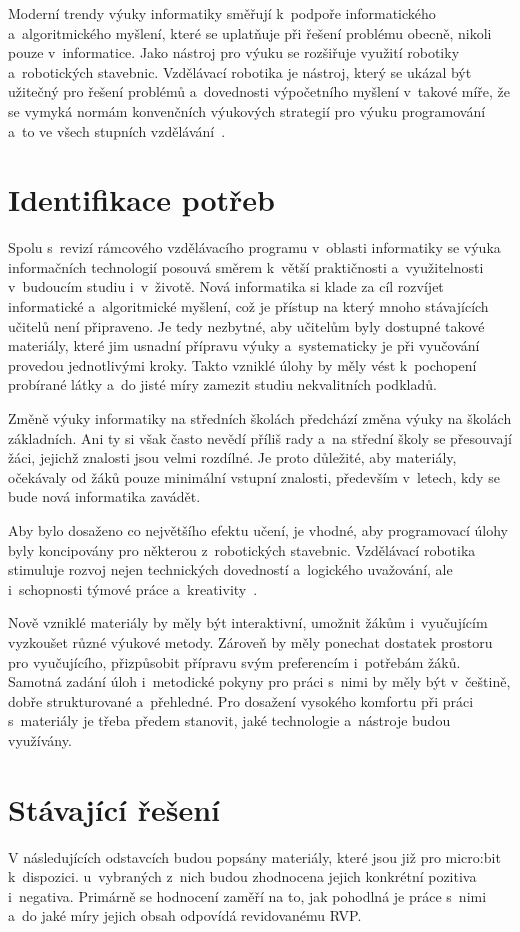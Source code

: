 \documentclass[
  digital,     %
  oneside,     %
  nosansbold,  %
  colorbold, %
  lof,         %
  nolot,         %
]{fithesis4}
\begin{document}
Moderní trendy výuky informatiky směřují k~podpoře informatického a~algoritmického myšlení, které se uplatňuje při řešení problému obecně, nikoli pouze v~informatice. Jako nástroj pro výuku se rozšiřuje využití robotiky a~robotických stavebnic. Vzdělávací robotika je nástroj, který se ukázal být užitečný pro řešení problémů a~dovednosti výpočetního myšlení v~takové míře, že se vymyká normám konvenčních výukových strategií pro výuku programování a~to ve všech stupních vzdělávání~\cite{Noor20}. 

\section{Identifikace potřeb}
Spolu s~revizí rámcového vzdělávacího programu v~oblasti informatiky se výuka informačních technologií posouvá směrem k~větší praktičnosti a~využitelnosti v~budoucím studiu i~v~životě. Nová informatika si klade za cíl rozvíjet informatické a~algoritmické myšlení, což je přístup na který mnoho stávajících učitelů není připraveno. Je tedy nezbytné, aby učitelům byly dostupné takové materiály, které jim usnadní přípravu výuky a~systematicky je při vyučování provedou jednotlivými kroky. Takto vzniklé úlohy by měly vést k~pochopení probírané látky a~do jisté míry zamezit studiu nekvalitních podkladů.

Změně výuky informatiky na středních školách předchází změna výuky na školách základních. Ani ty si však často nevědí příliš rady a~na střední školy se přesouvají žáci, jejichž znalosti jsou velmi rozdílné. Je proto důležité, aby materiály,  očekávaly od žáků pouze minimální vstupní znalosti, především v~letech, kdy se bude nová informatika zavádět.

Aby bylo dosaženo co největšího efektu učení, je vhodné, aby programovací úlohy byly koncipovány pro některou z~robotických stavebnic. Vzdělávací robotika stimuluje rozvoj nejen technických dovedností a~logického uvažování, ale i~schopnosti týmové práce a~kreativity~\cite{Souza18}. 

Nově vzniklé materiály by měly být interaktivní, umožnit žákům i~vyučujícím vyzkoušet různé výukové metody. Zároveň by měly ponechat dostatek prostoru pro vyučujícího, přizpůsobit přípravu svým preferencím i~potřebám žáků. Samotná zadání úloh i~metodické pokyny pro práci s~nimi by měly být v~češtině, dobře strukturované a~přehledné. Pro dosažení vysokého komfortu při práci s~materiály je třeba předem stanovit, jaké technologie a~nástroje budou využívány.

\section{Stávající řešení}
V následujících odstavcích budou popsány materiály, které jsou již pro micro:bit k~dispozici. u~vybraných z~nich budou zhodnocena jejich konkrétní pozitiva i~negativa. Primárně se hodnocení zaměří na to, jak pohodlná je práce s~nimi a~do jaké míry jejich obsah odpovídá revidovanému RVP. 
\end{document}
